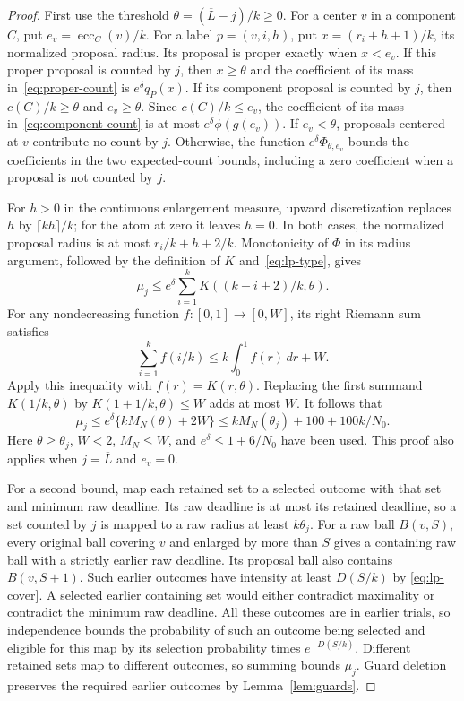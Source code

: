 \documentclass[11pt]{article}
\numberwithin{equation}{section}
\theoremstyle{definition}
\newcommand{\ecc}{\operatorname{ecc}}
\newcommand{\cL}{\overline L}
\begin{document}
\begin{proof}
First use the threshold $\theta=(\cL-j)/k\ge0$.
For a center $v$ in a component $C$, put
$e_v=\ecc_C(v)/k$. For a label $p=(v,i,h)$, put
$x=(r_i+h+1)/k$, its normalized proposal radius. Its proposal is proper
exactly when $x<e_v$.
If this proper proposal is counted by $j$, then $x\ge\theta$ and
the coefficient of its mass in~\eqref{eq:proper-count} is
$e^\delta q_P(x)$.
If its component proposal is counted by $j$, then
$c(C)/k\ge\theta$ and $e_v\ge\theta$. Since $c(C)/k\le e_v$,
the coefficient of its mass in~\eqref{eq:component-count} is at most
$e^\delta\phi(g(e_v))$. If $e_v<\theta$, proposals centered at $v$
contribute no count by $j$. Otherwise, the function
$e^\delta\Phi_{\theta,e_v}$ bounds the coefficients in the two
expected-count bounds, including a zero coefficient when a proposal
is not counted by $j$.

For $h>0$ in the continuous enlargement measure, upward discretization
replaces $h$ by $\lceil kh\rceil/k$; for the atom at zero it leaves
$h=0$. In both cases, the normalized proposal radius is at most
$r_i/k+h+2/k$. Monotonicity of $\Phi$ in its radius argument,
followed by the definition of $K$ and~\eqref{eq:lp-type}, gives
\[
 \mu_j\le e^\delta\sum_{i=1}^k K((k-i+2)/k,\theta).
\]
For any nondecreasing function $f:[0,1]\to[0,W]$, its right Riemann
sum satisfies
\[
 \sum_{i=1}^kf(i/k)\le k\int_0^1f(r)\,dr+W.
\]
Apply this inequality with $f(r)=K(r,\theta)$. Replacing the first
summand $K(1/k,\theta)$ by $K(1+1/k,\theta)\le W$ adds at most $W$.
It follows that
\begin{equation}\label{eq:new-discrete-bound}
 \mu_j\le e^\delta\{kM_N(\theta)+2W\}
           \le kM_N(\theta_j)+100+100k/N_0.
\end{equation}
Here $\theta\ge\theta_j$, $W<2$, $M_N\le W$, and
$e^\delta\le1+6/N_0$ have been used. This proof also applies when
$j=\cL$ and $e_v=0$.

For a second bound, map each retained set to a selected outcome with
that set and minimum raw deadline. Its raw deadline is at most its
retained deadline, so a set counted
by $j$ is mapped to a raw radius at least $k\theta_j$.
For a raw ball $B(v,S)$, every original ball covering $v$ and enlarged
by more than $S$ gives a containing raw ball with a strictly earlier raw
deadline. Its proposal ball also contains $B(v,S+1)$.
Such earlier outcomes have intensity at least $D(S/k)$ by
\eqref{eq:lp-cover}. A selected earlier containing set would either
contradict maximality or contradict the minimum raw deadline.
All these outcomes are in earlier trials, so independence bounds the
probability of such an outcome being selected and eligible for this map
by its selection probability times $e^{-D(S/k)}$. Different retained
sets map to different outcomes, so summing bounds $\mu_j$. Guard deletion preserves the required earlier outcomes
by Lemma~\ref{lem:guards}.


\end{proof}
\end{document}
